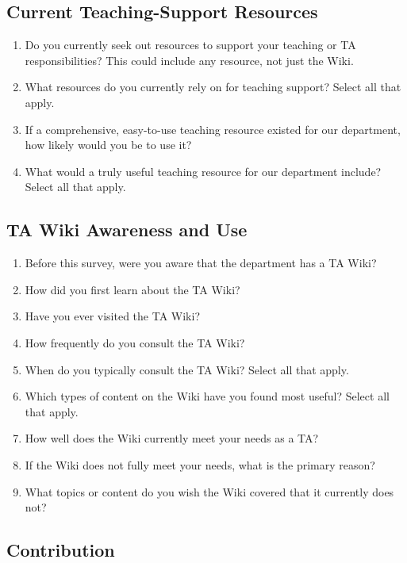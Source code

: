 \documentclass[11pt]{article}
\begin{document}
\subsection{Current Teaching-Support Resources}

\begin{enumerate}
  \item Do you currently seek out resources to support your teaching or TA responsibilities? This could include any resource, not just the Wiki.
  \item What resources do you currently rely on for teaching support? Select all that apply.
  \item If a comprehensive, easy-to-use teaching resource existed for our department, how likely would you be to use it?
  \item What would a truly useful teaching resource for our department include? Select all that apply.
\end{enumerate}

\subsection{TA Wiki Awareness and Use}

\begin{enumerate}
  \item Before this survey, were you aware that the department has a TA Wiki?
  \item How did you first learn about the TA Wiki?
  \item Have you ever visited the TA Wiki?
  \item How frequently do you consult the TA Wiki?
  \item When do you typically consult the TA Wiki? Select all that apply.
  \item Which types of content on the Wiki have you found most useful? Select all that apply.
  \item How well does the Wiki currently meet your needs as a TA?
  \item If the Wiki does not fully meet your needs, what is the primary reason?
  \item What topics or content do you wish the Wiki covered that it currently does not?
\end{enumerate}

\subsection{Contribution}
\end{document}
